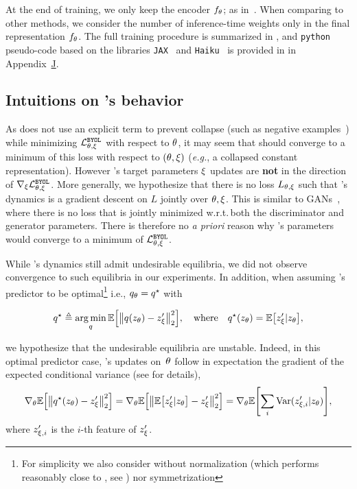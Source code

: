 At the end of training, we only keep the encoder $f_{\theta}$; as in~\cite{MOCO}. When comparing to other methods, we consider the number of inference-time weights only in the final representation $f_{\theta}$.
The full training procedure is summarized in , and \texttt{python} pseudo-code based on the libraries \texttt{JAX}~\cite{jax2018github} and \texttt{Haiku}~\cite{haiku2020github} is provided in
in Appendix~\hyperlink{page.33}{J}.

\subsection{Intuitions on \algo's behavior}
\label{sec:intuition_byol}
As \algo does not use an explicit term to prevent collapse (such as negative examples~\cite{CPC}) while minimizing $\mathcal L_{{\theta},\xi}^\texttt{BYOL}$ with respect to ${\theta}$, it may seem that \algo should converge to a minimum of this loss with respect to $({\theta}, \xi)$ (\emph{e.g.}, a collapsed constant representation). However \algo's target parameters $\xi$ updates are \textbf{not} in the direction of $\nabla_\xi \mathcal L_{{\theta},\xi}^\texttt{BYOL}$. More generally, we hypothesize that there is no loss $L_{{\theta}, \xi}$ such that \algo's dynamics is a gradient descent on $L$ jointly over ${\theta}, \xi$. This is similar to GANs~\cite{goodfellow2014generative}, where there is no loss that is jointly minimized w.r.t.\,both the discriminator and generator parameters. 
There is therefore no \textit{a priori} reason why \algo's parameters would converge to a minimum of $\mathcal{L}^\texttt{BYOL}_{{\theta}, \xi}$. 

While \algo's dynamics still admit undesirable equilibria, we did not observe convergence to such equilibria in our experiments. In addition, when assuming \algo's predictor to be optimal\footnote{For simplicity we also consider \algo without normalization (which performs reasonably close to \algo, see ) nor symmetrization} i.e., $q_{\theta} = q^\star$ with 

\begin{equation}
\label{eq:optimal_predictor}
    q^\star \eqdef \argmin_q \EE{\normtwo{q(z_\netparams) - z'_\targetparams}^2}, \quad \text{where} \quad q^\star(z_\netparams) = \EE{z'_\targetparams | z_\netparams},
\end{equation}

we hypothesize that the undesirable equilibria are unstable. Indeed, in this optimal predictor case, \algo's updates on~${\theta}$ follow in expectation the gradient of the expected conditional variance (see  for details),
\begin{equation}
\label{eq:byol_minimize_cond_var}
    \nabla_\netparams\EE{\normtwo{q^\star(z_\netparams) - z'_\targetparams}^2} = \nabla_\netparams\EE{\normtwo{\EE{z'_\targetparams | z_\netparams} -z'_\targetparams }^2} = \nabla_\netparams \EE{ \sum_i \var(z'_{\targetparams, i} | z_\netparams)},
\end{equation}
where $z'_{\xi, i}$ is the $i$-th feature of $z'_{\xi}$. 

